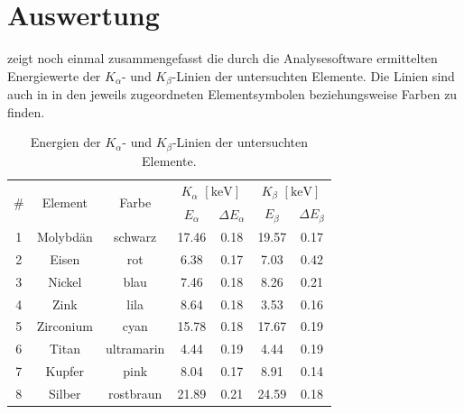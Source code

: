 \section{Auswertung}

 zeigt noch einmal zusammengefasst die durch die Analysesoftware ermittelten Energiewerte der $K_{\alpha}$- und $K_{\beta}$-Linien der untersuchten Elemente. Die Linien sind auch in  in den jeweils zugeordneten Elementsymbolen beziehungsweise Farben zu finden.


\begin{table}[H]
  \centering
  \begin{tabular}{|c|c|c|c c|c c|}
      \hline
      \multirow{2}{*}{\#} & \multirow{2}{*}{Element}  & \multirow{2}{*}{Farbe}  & \multicolumn{2}{c|}{$K_{\alpha}$ $[\si{\kilo\electronvolt}]$}  & \multicolumn{2}{c|}{$K_{\beta}$ $[\si{\kilo\electronvolt}]$} \\\cline{4-7}
      && & $E_{\alpha}$ & $\Delta E_{\alpha}$ & $E_{\beta}$ & $\Delta E_{\beta}$ \\
      \hline
      1  & Molybdän  & schwarz    & 17.46 & 0.18 & 19.57 & 0.17 \\
      2  & Eisen     & rot        & 6.38  & 0.17 & 7.03  & 0.42 \\
      3  & Nickel    & blau       & 7.46  & 0.18 & 8.26  & 0.21 \\
      4  & Zink      & lila       & 8.64  & 0.18 & 3.53  & 0.16 \\
      5  & Zirconium & cyan       & 15.78 & 0.18 & 17.67 & 0.19 \\
      6  & Titan     & ultramarin & 4.44  & 0.19 & 4.44  & 0.19 \\
      7  & Kupfer    & pink       & 8.04  & 0.17 & 8.91  & 0.14 \\
      8  & Silber    & rostbraun  & 21.89 & 0.21 & 24.59 & 0.18 \\
      \hline
  \end{tabular}
  \caption{Energien der $K_{\alpha}$- und $K_{\beta}$-Linien der untersuchten Elemente.}
  \label{tab:elemente_kalph_kbeta}
\end{table}

